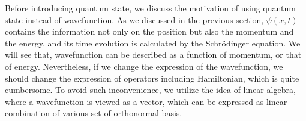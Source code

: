 \documentclass{book}
\begin{document}
Before introducing quantum state, we discuss the motivation of using quantum state instead of wavefunction. As we discussed in the previous section, $\psi(x,t)$ contains the information not only on the position but also the momentum and the energy, and its time evolution is calculated by the Schr\"odinger equation. We will see that, wavefunction can be described as a function of momentum, or that of energy. Nevertheless, if we change the expression of the wavefunction, we should change the expression of operators including Hamiltonian, which is quite cumbersome. To avoid such inconvenience, we utilize the idea of linear algebra, where a wavefunction is viewed as a vector, which can be expressed as linear combination of various set of orthonormal basis.

\end{document}
